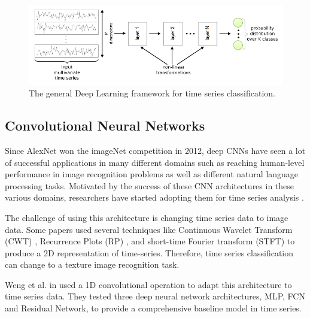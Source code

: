 \begin{figure}[H]
    \centering
    \begin{minipage}[b]{\textwidth}
        \includegraphics[width=\textwidth]{figures/project/app1.png}
    \end{minipage}
    \caption{The general Deep Learning framework for time series classification.}
    \label{fig:a1}
\end{figure}

\subsection{Convolutional Neural Networks}

Since AlexNet \cite{Krizhevsky2017ImageNetNetworks} won the imageNet competition in 2012, deep CNNs have seen a lot of successful applications in many different domains such as reaching human-level performance in image recognition problems as well as different natural language processing tasks. Motivated by the success of these CNN architectures in these various domains, researchers have started adopting them for time series analysis \cite{Gamboa2017DeepAnalysis}. 

The challenge of using this architecture is changing time series data to image data. Some papers used several techniques like Continuous Wavelet Transform (CWT) \cite{Wang2021AutomaticNetwork}, Recurrence Plots (RP) \cite{Hatami2017ClassificationNetworks}, and short-time Fourier transform (STFT) \cite{Huang2019ECGNetwork} to produce a 2D representation of time-series. Therefore, time series classification can change to a texture image recognition task.

Weng et al. in \cite{WangTimeBaseline} used a 1D convolutional operation to adapt this architecture to time series data. They tested three deep neural network architectures, MLP, FCN and Residual Network, to provide a comprehensive baseline model in time series.




